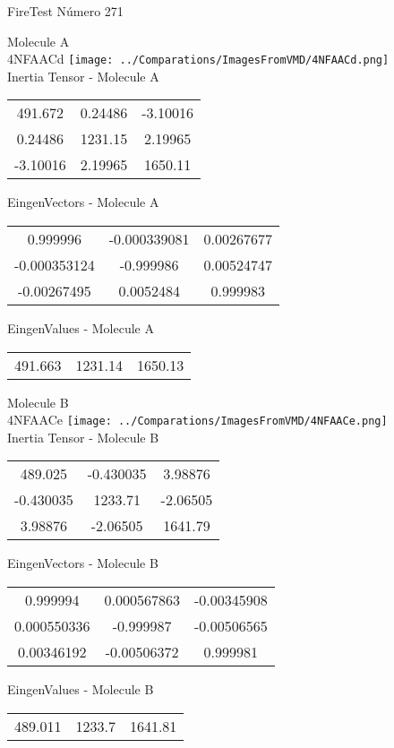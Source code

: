 \vtab[-2cm]
\begin{center}
{\large FireTest \tab Número 271}
\end{center}
\begin{multicols}{2}
\begin{center}

Molecule A \\ 
4NFAACd
\texttt{[image: ../Comparations/ImagesFromVMD/4NFAACd.png]}
\\
Inertia Tensor - Molecule A \\
\vtab

\begin{tabular}{|c c c|}
491.672	 & 	0.24486	 & 	-3.10016	 \\
0.24486	 & 	1231.15	 & 	2.19965	 \\
-3.10016	 & 	2.19965	 & 	1650.11
\end{tabular}

\vtab
 EingenVectors - Molecule A     \\
\vtab
\begin{tabular}{|c c c|}
0.999996	 & 	-0.000339081	 & 	0.00267677	 \\
-0.000353124	 & 	-0.999986	 & 	0.00524747	 \\
-0.00267495	 & 	0.0052484	 & 	0.999983
\end{tabular}

\vtab
 EingenValues - Molecule A     \\
\vtab
\begin{tabular}{|c c c|}
491.663	 & 	1231.14	 & 	1650.13	 \\
\end{tabular}
\columnbreak

Molecule B \\ 
4NFAACe
\texttt{[image: ../Comparations/ImagesFromVMD/4NFAACe.png]}
\\
Inertia Tensor - Molecule B \\
\vtab

\begin{tabular}{|c c c|}
489.025	 & 	-0.430035	 & 	3.98876	 \\
-0.430035	 & 	1233.71	 & 	-2.06505	 \\
3.98876	 & 	-2.06505	 & 	1641.79
\end{tabular}

\vtab
 EingenVectors - Molecule B     \\
\vtab
\begin{tabular}{|c c c|}
0.999994	 & 	0.000567863	 & 	-0.00345908	 \\
0.000550336	 & 	-0.999987	 & 	-0.00506565	 \\
0.00346192	 & 	-0.00506372	 & 	0.999981
\end{tabular}

\vtab
 EingenValues - Molecule B     \\
\vtab
\begin{tabular}{|c c c|}
489.011	 & 	1233.7	 & 	1641.81	 \\
\end{tabular}

\end{center}
\end{multicols}
